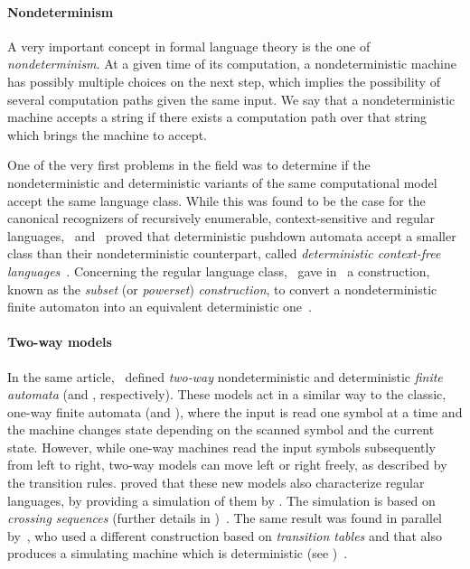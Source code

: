 \paragraph{Nondeterminism} A very important concept in formal language theory is the one of \emph{nondeterminism}.
At a given time of its computation, a nondeterministic machine has possibly multiple choices on the next step, which implies the possibility of several computation paths given the same input.
We say that a nondeterministic machine accepts a string if there exists a computation path over that string which brings the machine to accept.

One of the very first problems in the field was to determine if the nondeterministic and deterministic variants of the same computational model accept the same language class.
While this was found to be the case for the canonical recognizers of recursively enumerable, context-sensitive and regular languages,~\citeauthor{Fis63} and~\citeauthor{Sch63} proved that deterministic pushdown automata accept a smaller class than their nondeterministic counterpart, called \emph{deterministic context-free languages}~\cite{Fis63,Sch63}.
Concerning the regular language class,~\citeauthor{RabSco59} gave in~\citeyear{RabSco59} a construction, known as the \emph{subset} (or \emph{powerset}) \emph{construction}, to convert a nondeterministic finite automaton into an equivalent deterministic one~\cite{RabSco59}.

\paragraph{Two-way models} In the same article,~\citeauthor{RabSco59} defined \emph{two-way} nondeterministic and deterministic \emph{finite automata} (\TNFAs and \TDFAs, respectively).
These models act in a similar way to the classic, one-way finite automata (\ONFAs and \ODFAs), where the input is read one symbol at a time and the machine changes state depending on the scanned symbol and the current state. However, while one-way machines read the input symbols subsequently from left to right, two-way models can move left or right freely, as described by the transition rules.
\citeauthor{RabSco59} proved that these new models also characterize regular languages, by providing a simulation of them by \ONFAs. The simulation is based on \emph{crossing sequences} (further details in )~\cite{RabSco59}.
The same result was found in parallel by~\citeauthor{She59}, who used a different construction based on \emph{transition tables} and that also produces a simulating machine which is deterministic (see )~\cite{She59}.



